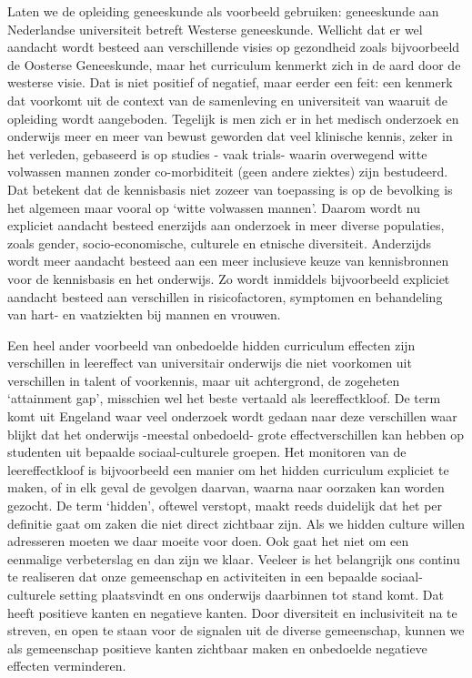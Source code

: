 \documentclass{jote-book}
\begin{document}
	Laten we de opleiding geneeskunde als voorbeeld gebruiken: geneeskunde aan Nederlandse universiteit betreft Westerse geneeskunde. Wellicht dat er wel aandacht wordt besteed aan verschillende visies op gezondheid zoals bijvoorbeeld de Oosterse Geneeskunde, maar het curriculum kenmerkt zich in de aard door de westerse visie. Dat is niet positief of negatief, maar eerder een feit: een kenmerk dat voorkomt uit de context van de samenleving en universiteit van waaruit de opleiding wordt aangeboden. Tegelijk is men zich er in het medisch onderzoek en onderwijs meer en meer van bewust geworden dat veel klinische kennis, zeker in het verleden, gebaseerd is op studies - vaak trials- waarin overwegend witte volwassen mannen zonder co-morbiditeit (geen andere ziektes) zijn bestudeerd. Dat betekent dat de kennisbasis niet zozeer van toepassing is op de bevolking is het algemeen maar vooral op ‘witte volwassen mannen'. Daarom wordt nu expliciet aandacht besteed enerzijds aan onderzoek in meer diverse populaties, zoals gender, socio-economische, culturele en etnische diversiteit. Anderzijds wordt meer aandacht besteed aan een meer inclusieve keuze van kennisbronnen voor de kennisbasis en het onderwijs. Zo wordt inmiddels bijvoorbeeld expliciet aandacht besteed aan verschillen in risicofactoren, symptomen en behandeling van hart- en vaatziekten bij mannen en vrouwen.



	Een heel ander voorbeeld van onbedoelde hidden curriculum effecten zijn verschillen in leereffect van universitair onderwijs die niet voorkomen uit verschillen in talent of voorkennis, maar uit achtergrond, de zogeheten ‘attainment gap', misschien wel het beste vertaald als leereffectkloof. De term komt uit Engeland waar veel onderzoek wordt gedaan naar deze verschillen waar blijkt dat het onderwijs -meestal onbedoeld- grote effectverschillen kan hebben op studenten uit bepaalde sociaal-culturele groepen. Het monitoren van de leereffectkloof is bijvoorbeeld een manier om het hidden curriculum expliciet te maken, of in elk geval de gevolgen daarvan, waarna naar oorzaken kan worden gezocht. De term ‘hidden', oftewel verstopt, maakt reeds duidelijk dat het per definitie gaat om zaken die niet direct zichtbaar zijn. Als we hidden culture willen adresseren moeten we daar moeite voor doen. Ook gaat het niet om een eenmalige verbeterslag en dan zijn we klaar. Veeleer is het belangrijk ons continu te realiseren dat onze gemeenschap en activiteiten in een bepaalde sociaal-culturele setting plaatsvindt en ons onderwijs daarbinnen tot stand komt. Dat heeft positieve kanten en negatieve kanten. Door diversiteit en inclusiviteit na te streven, en open te staan voor de signalen uit de diverse gemeenschap, kunnen we als gemeenschap positieve kanten zichtbaar maken en onbedoelde negatieve effecten verminderen.
\end{document}
